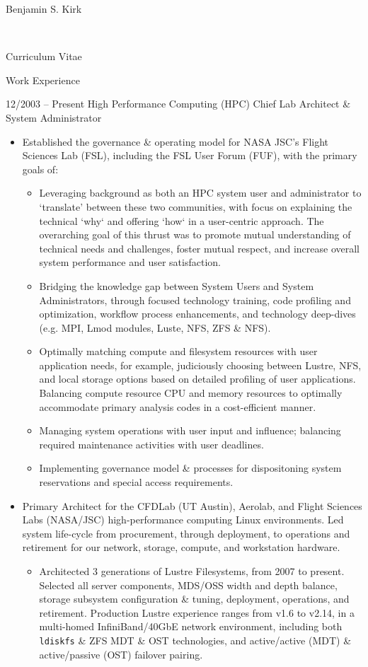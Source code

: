 \documentclass[10pt]{report}
\begin{document}
\begin{cv}{\centerline{\Large Benjamin S. Kirk}\\
    \centerline{\large Curriculum Vitae}}
\begin{cvlist}{Work Experience}
  \item[12/2003 -- Present]
    High Performance Computing (HPC) Chief Lab Architect \& System Administrator
    \begin{itemize}
      \item
        Established the governance \& operating model for NASA JSC's Flight  Sciences Lab (FSL), including the FSL User Forum (FUF), with the primary goals of:
        \begin{itemize}
        \item
          Leveraging background as both an HPC system user and administrator to `translate' between these two communities, with focus on explaining the technical `why` and offering `how` in a user-centric approach. The overarching goal of this thrust was to promote mutual understanding of technical needs and challenges, foster mutual respect, and increase overall system performance and user satisfaction.
        \item
          Bridging the knowledge gap between System Users and System Administrators, through focused technology training, code profiling and optimization, workflow process enhancements, and technology deep-dives (e.g. MPI, Lmod modules, Luste, NFS, ZFS \& NFS).
        \item
          Optimally matching compute and filesystem resources with user application needs, for example, judiciously choosing between Lustre, NFS, and local storage options based on detailed profiling of user applications.  Balancing compute resource CPU and memory resources to optimally accommodate primary analysis codes in a cost-efficient manner.
        \item
          Managing system operations with user input and influence; balancing required maintenance activities with user deadlines.
        \item
          Implementing governance model \& processes for dispositoning system reservations and special access requirements.
        \end{itemize}
      \item
        Primary Architect for the CFDLab (UT Austin), Aerolab, and Flight Sciences Labs (NASA/JSC) high-performance computing Linux environments. Led system life-cycle from procurement, through deployment, to operations and retirement for our network, storage, compute, and workstation hardware.
    \begin{itemize}
      \item
        Architected 3 generations of Lustre Filesystems, from 2007 to present.  Selected all server components, MDS/OSS width and depth balance, storage subsystem configuration \& tuning, deployment, operations, and retirement.  Production Lustre experience ranges from v1.6 to v2.14, in a multi-homed InfiniBand/40GbE network environment, including both \texttt{ldiskfs} \& ZFS MDT \& OST technologies, and active/active (MDT) \& active/passive (OST) failover pairing.

\end{itemize}
\end{itemize}
\end{cvlist}
\end{cv}
\end{document}
